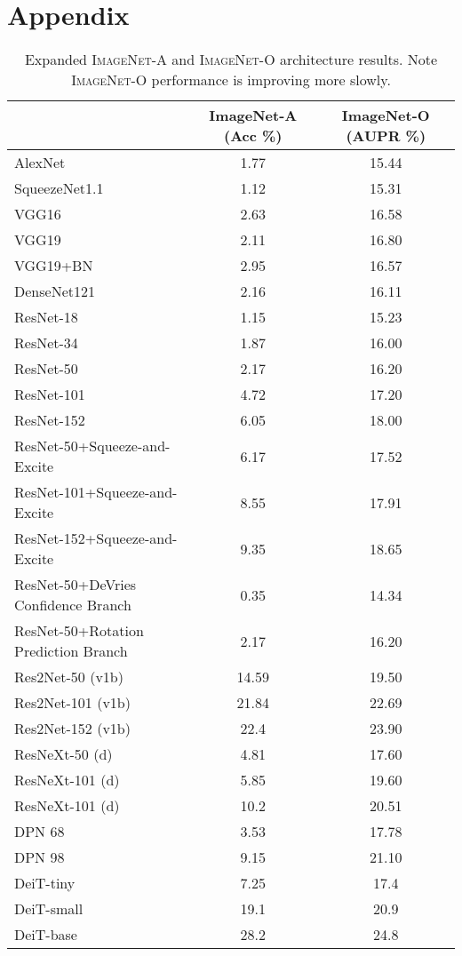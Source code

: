 \documentclass[10pt,twocolumn,letterpaper]{article}
\begin{document}
\section{Appendix}
\begin{table*}[t]
\vspace{-10pt}
\begin{center}
\begin{tabular}{lcc}\hline
                        & ImageNet-A (Acc \%) & ImageNet-O (AUPR \%) \\
                        \hline AlexNet                 & 1.77  & 15.44     \\
SqueezeNet1.1           & 1.12  & 15.31     \\
VGG16                   & 2.63  & 16.58     \\
VGG19                   & 2.11  & 16.80     \\
VGG19+BN                & 2.95  & 16.57     \\
DenseNet121             & 2.16  & 16.11     \\
\hline
ResNet-18               & 1.15  & 15.23     \\
ResNet-34               & 1.87  & 16.00     \\
ResNet-50               & 2.17  & 16.20     \\
ResNet-101              & 4.72  & 17.20     \\
ResNet-152              & 6.05  & 18.00     \\
\hline
ResNet-50+Squeeze-and-Excite            & 6.17  & 17.52     \\
ResNet-101+Squeeze-and-Excite           & 8.55  & 17.91     \\
ResNet-152+Squeeze-and-Excite           & 9.35  & 18.65     \\
\hline
ResNet-50+DeVries Confidence Branch & 0.35 & 14.34 \\
ResNet-50+Rotation Prediction Branch & 2.17 & 16.20 \\
\hline
Res2Net-50 (v1b)        & 14.59 & 19.50     \\
Res2Net-101 (v1b)       & 21.84 & 22.69     \\
Res2Net-152 (v1b)       & 22.4  & 23.90     \\
\hline
ResNeXt-50 (d)   & 4.81  & 17.60 \\
ResNeXt-101 (d)  & 5.85  & 19.60 \\
ResNeXt-101 (d)   & 10.2  & 20.51 \\
\hline
DPN 68                  & 3.53  & 17.78     \\
DPN 98                  & 9.15  & 21.10     \\
\hline
DeiT-tiny        & 7.25 & 17.4 \\
DeiT-small        & 19.1 & 20.9 \\
DeiT-base        & 28.2 & 24.8 \\
\hline
\end{tabular}
\end{center}
\caption{Expanded \textsc{ImageNet-A} and \textsc{ImageNet-O} architecture results. Note \textsc{ImageNet-O} performance is improving more slowly.}\label{tab:fullarch}
\vspace{-10pt}
\end{table*}
\end{document}
